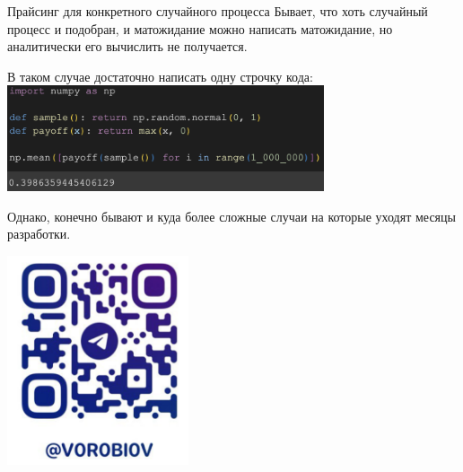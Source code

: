 \documentclass{beamer}
\begin{document}
    \begin{frame}{Прайсинг для конкретного случайного процесса}
        Бывает, что хоть случайный процесс и подобран, и матожидание можно написать матожидание, но аналитически его вычислить не получается.

        В таком случае достаточно написать одну строчку кода:
        \includegraphics[width=0.7\textwidth]{code.png}

        Однако, конечно бывают и куда более сложные случаи на которые уходят месяцы разработки.

    \end{frame}


    \begin{frame}
        \center
        \includegraphics[width=0.4\textwidth]{me.png}
    \end{frame}
\end{document}
